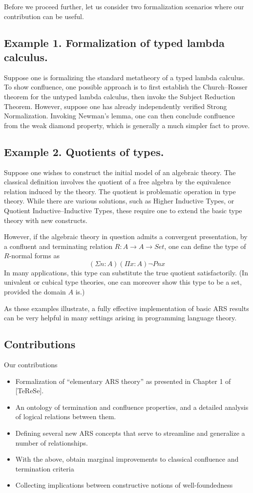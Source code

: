 Before we proceed further, let us consider two formalization scenarios where
our contribution can be useful.

\subsection*{Example 1. Formalization of typed lambda calculus.}

Suppose one is formalizing the standard metatheory of
a typed lambda calculus.  To show confluence, one possible approach is to
first establish the Church--Rosser theorem for the untyped lambda calculus,
then invoke the Subject Reduction Theorem.
However, suppose one has already independently verified Strong Normalization.
Invoking Newman's lemma, one can then conclude confluence from the weak
diamond property, which is generally a much simpler fact to prove.

\subsection*{Example 2. Quotients of types.}
Suppose one wishes to construct the initial model of an algebraic theory.
The classical definition involves the quotient of a free algebra by
the equivalence relation induced by the theory.
The quotient is problematic operation in type theory.
While there are various solutions, such as Higher Inductive Types,
or Quotient Inductive--Inductive Types, these require one to extend the
basic type theory with new constructs.

However, if the algebraic theory in question admits a convergent presentation,
by a confluent and terminating relation $R : A \to A \to Set$, one can define the type of
$R$-normal forms as
\[  (\Sigma n : A) (\Pi x : A) \lnot P n x \]
In many applications, this type can substitute the true quotient satisfactorily.
(In univalent or cubical type theories, one can moreover show this type to be
a set, provided the domain $A$ is.)

As these examples illustrate, a fully effective implementation of basic ARS results
can be very helpful in many settings arising in programming language theory.

\subsection{Contributions}
Our contributions
\begin{itemize}
  \item Formalization of ``elementary ARS theory'' as presented in
  Chapter 1 of [TeReSe].
  \item An ontology of termination and confluence properties, and a detailed analysis of logical relations between them.
  \item Defining several new ARS concepts that serve to streamline and generalize a number of relationships.
  \item With the above, obtain marginal improvements to classical confluence and termination criteria
  \item Collecting implications between constructive notions of well-foundedness
\end{itemize}

